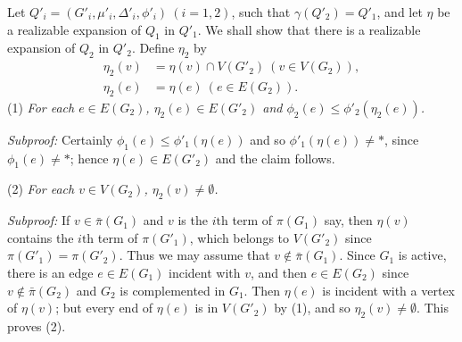 Let $Q'_i = (G'_i, \mu'_i, \Delta'_i, \phi'_i)\ (i = 1, 2)$, such that $\gamma(Q'_2) = Q'_1$, and let $\eta$ be a realizable expansion of $Q_1$ in $Q'_1$. We shall show that there is a realizable expansion of $Q_2$ in $Q'_2$. Define $\eta_2$ by
\begin{align*}
\eta_2(v) &= \eta(v) \cap V(G'_2)\ (v \in V(G_2)), \\
\eta_2(e) &= \eta(e)\ (e \in E(G_2)).
\end{align*}
\hspace*{12pt}(1) \textit{For each $e \in E(G_2)$, $\eta_2(e) \in E(G'_2)$ and $\phi_2(e) \le \phi'_2(\eta_2(e))$.}

\textit{Subproof:} Certainly $\phi_1(e) \le \phi'_1(\eta(e))$ and so $\phi'_1(\eta(e)) \ne *$, since $\phi_1(e) \ne *$; hence $\eta(e) \in E(G'_2)$ and the claim follows.

\hspace*{12pt}(2) \textit{For each $v \in V(G_2)$, $\eta_2(v) \ne \emptyset$.}

\textit{Subproof:} If $v \in \bar{\pi}(G_1)$ and $v$ is the $i\text{th}$ term of $\pi(G_1)$ say, then $\eta(v)$ contains the $i\text{th}$ term of $\pi(G'_1)$, which belongs to $V(G'_2)$ since $\pi(G'_1) = \pi(G'_2)$. Thus we may assume that $v \notin \bar{\pi}(G_1)$. Since $G_1$ is active, there is an edge $e \in E(G_1)$ incident with $v$, and then $e \in E(G_2)$ since $v \notin \bar{\pi}(G_2)$ and $G_2$ is complemented in $G_1$. Then $\eta(e)$ is incident with a vertex of $\eta(v)$; but every end of $\eta(e)$ is in $V(G'_2)$ by (1), and so $\eta_2(v) \ne \emptyset$. This proves (2).

